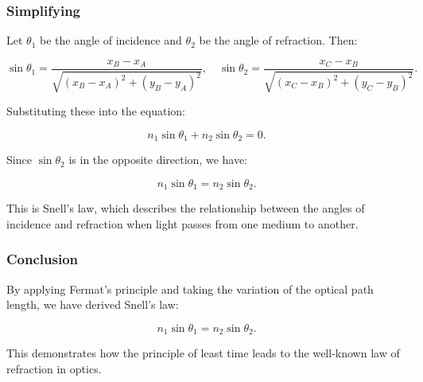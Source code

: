 \documentclass[
  a4paper,
]{book}
\begin{document}
\begin{tcolorbox}
\subsubsection{Simplifying}\label{simplifying}

Let \(\theta_1\) be the angle of incidence and \(\theta_2\) be the angle
of refraction. Then:

\[
\sin \theta_1 = \frac{x_B - x_A}{\sqrt{(x_B - x_A)^2 + (y_B - y_A)^2}}, \quad \sin \theta_2 = \frac{x_C - x_B}{\sqrt{(x_C - x_B)^2 + (y_C - y_B)^2}}.
\]

Substituting these into the equation:

\[
n_1 \sin \theta_1 + n_2 \sin \theta_2 = 0.
\]

Since \(\sin \theta_2\) is in the opposite direction, we have:

\[
n_1 \sin \theta_1 = n_2 \sin \theta_2.
\]

This is Snell's law, which describes the relationship between the angles
of incidence and refraction when light passes from one medium to
another.

\subsubsection{Conclusion}\label{conclusion}

By applying Fermat's principle and taking the variation of the optical
path length, we have derived Snell's law:

\[
n_1 \sin \theta_1 = n_2 \sin \theta_2.
\]

This demonstrates how the principle of least time leads to the
well-known law of refraction in optics.

\end{tcolorbox}
\end{document}

